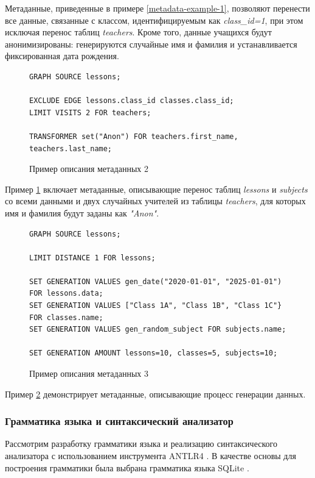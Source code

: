 Метаданные, приведенные в примере \ref{metadata-example-1}, позволяют перенести все данные, связанные с классом, идентифицируемым как \textit{class\_id=1}, при этом исключая перенос таблиц \textit{teachers}. Кроме того, данные учащихся будут анонимизированы: генерируются случайные имя и фамилия и устанавливается фиксированная дата рождения.

\begin{figure}
  \begin{lstlisting}
GRAPH SOURCE lessons;

EXCLUDE EDGE lessons.class_id classes.class_id;
LIMIT VISITS 2 FOR teachers;

TRANSFORMER set("Anon") FOR teachers.first_name, teachers.last_name;
  \end{lstlisting}
  \caption{Пример описания метаданных 2}
  \label{metadata-example-2}
\end{figure}

Пример \ref{metadata-example-2} включает метаданные, описывающие перенос таблиц \textit{lessons} и \textit{subjects} со всеми данными и двух случайных учителей из таблицы \textit{teachers}, для которых имя и фамилия будут заданы как \textit{"Anon"}.

\begin{figure}
  \begin{lstlisting}
GRAPH SOURCE lessons;

LIMIT DISTANCE 1 FOR lessons;

SET GENERATION VALUES gen_date("2020-01-01", "2025-01-01") FOR lessons.data;
SET GENERATION VALUES ["Class 1A", "Class 1B", "Class 1C"} FOR classes.name;
SET GENERATION VALUES gen_random_subject FOR subjects.name;

SET GENERATION AMOUNT lessons=10, classes=5, subjects=10;
  \end{lstlisting}
  \caption{Пример описания метаданных 3}
  \label{metadata-example-3}
\end{figure}

Пример \ref{metadata-example-3} демонстрирует метаданные, описывающие процесс генерации данных.

\subsubsection{Грамматика языка и синтаксический анализатор}
Рассмотрим разработку грамматики языка и реализацию синтаксического анализатора \cite{parsers} с использованием инструмента ANTLR4 \cite{antlr}. В качестве основы для построения грамматики была выбрана грамматика языка SQLite \cite{sqlite-parser}.

